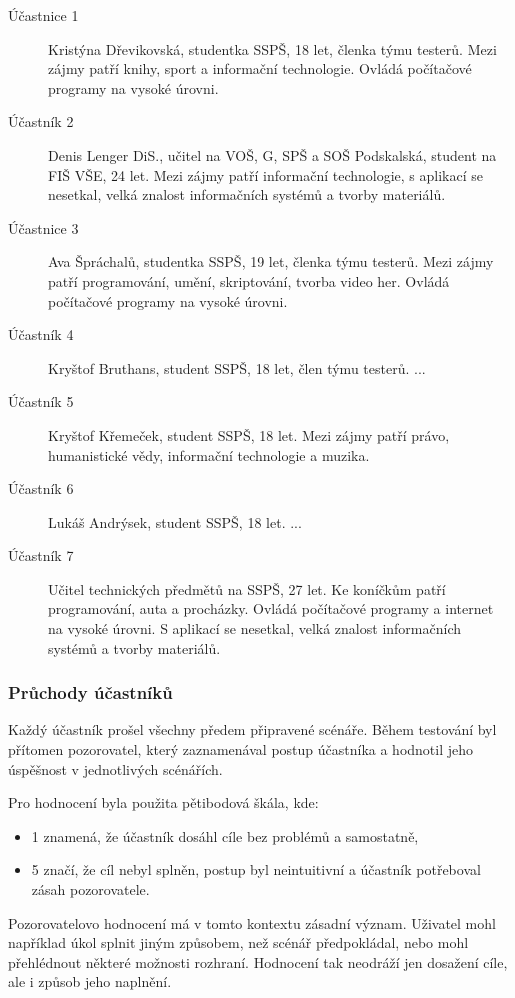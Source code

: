 \begin{description}
\item[Účastnice 1] Kristýna Dřevikovská, studentka SSPŠ, 18 let, členka týmu testerů. Mezi zájmy patří knihy, sport a informační technologie. Ovládá počítačové programy na vysoké úrovni.
\item[Účastník 2] Denis Lenger DiS., učitel na VOŠ, G, SPŠ a SOŠ Podskalská, student na FIŠ VŠE, 24 let. Mezi zájmy patří informační technologie, s aplikací se nesetkal, velká znalost informačních systémů a tvorby materiálů.
\item[Účastnice 3] Ava Špráchalů, studentka SSPŠ, 19 let, členka týmu testerů. Mezi zájmy patří programování, umění, skriptování, tvorba video her. Ovládá počítačové programy na vysoké úrovni.
\item[Účastník 4] Kryštof Bruthans, student SSPŠ, 18 let, člen týmu testerů. ...
\item[Účastník 5] Kryštof Křemeček, student SSPŠ, 18 let. Mezi zájmy patří právo, humanistické vědy, informační technologie a muzika.
\item[Účastník 6] Lukáš Andrýsek, student SSPŠ, 18 let. ...
\item[Účastník 7] Učitel technických předmětů na SSPŠ, 27 let. Ke koníčkům patří programování, auta a procházky. Ovládá počítačové programy a internet na vysoké úrovni. S aplikací se nesetkal, velká znalost informačních systémů a tvorby materiálů.
\end{description}

\subsubsection{Průchody účastníků}

Každý účastník prošel všechny předem připravené scénáře.
Během testování byl přítomen pozorovatel, který zaznamenával postup účastníka a hodnotil jeho úspěšnost v jednotlivých scénářích. 

Pro hodnocení byla použita pětibodová škála, kde:

\begin{itemize}
      \item 1 znamená, že účastník dosáhl cíle bez problémů a samostatně,
      \item 5 značí, že cíl nebyl splněn, postup byl neintuitivní a účastník potřeboval zásah pozorovatele.
\end{itemize}

Pozorovatelovo hodnocení má v tomto kontextu zásadní význam. 
Uživatel mohl například úkol splnit jiným způsobem, než scénář předpokládal, nebo mohl přehlédnout některé možnosti rozhraní. 
Hodnocení tak neodráží jen dosažení cíle, ale i způsob jeho naplnění.

